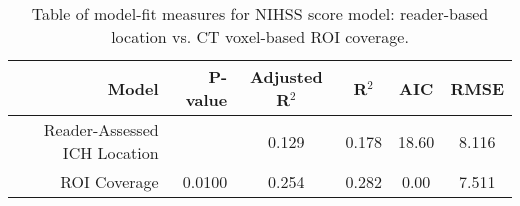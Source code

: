 \begin{table}[H]
\centering
\begin{tabular}{rrcccc}
  \hline
{\bf Model} & {\bf P-value} & {\bf Adjusted R$^2$} & {\bf R$^2$} & {\bf AIC} & {\bf RMSE} \\ 
  \hline
Reader-Assessed ICH Location &  & 0.129 & 0.178 & 18.60 & 8.116 \\ 
  ROI Coverage & 0.0100 & 0.254 & 0.282 & 0.00 & 7.511 \\ 
   \hline
\end{tabular}
\caption{Table of model-fit measures for NIHSS score model: reader-based location vs. CT voxel-based ROI coverage.} 
\label{t:nihss}
\end{table}
